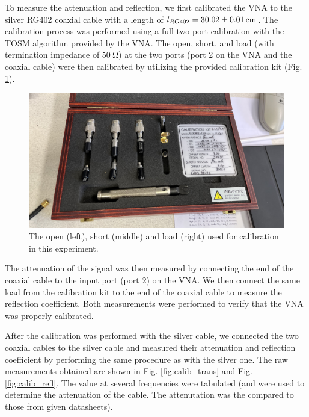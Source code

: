 \documentclass[a4paper]{article}
\numberwithin{equation}{section}
\begin{document}
To measure the attenuation and reflection, we first calibrated the VNA to the
silver RG402 coaxial cable with a length of $l_{RG402} =
\SI{30.02 \pm 0.01}{\centi\meter}$. The calibration process was performed using a
full-two port calibration with the TOSM algorithm provided by the VNA. The open,
short, and load (with termination impedance of $\SI{50}{\ohm}$) at the two ports
(port 2 on the VNA and the coaxial cable) were then calibrated by utilizing the provided calibration kit
(Fig. \ref*{fig:calibration_kit}). 

\begin{figure}
	\centering
	\includegraphics[width=0.8\columnwidth]{calibration_kit.jpg}
	\caption{The open (left), short (middle) and load (right) used for 
			calibration in this experiment.}

	\label{fig:calibration_kit}
\end{figure}

The attenuation of the signal was then measured by connecting the end of the
coaxial cable to the input port (port 2) on the VNA. We then connect the same load from the
calibration kit to the end of the coaxial cable to measure the reflection
coefficient. Both measurements were performed to verify that the VNA was
properly calibrated. \par 

After the calibration was performed with the silver cable, we connected the two
coaxial cables to the silver cable and measured their attenuation and reflection
coefficient by performing the same procedure as with the silver one. The raw
measurements obtained are shown in Fig.  \ref*{fig:calib_trans} and 
Fig. \ref*{fig:calib_refl}. The value at several frequencies were tabulated (and
were used to determine the attenuation of the cable. The attenutation was the
compared to those from given datasheets). 
\end{document}
